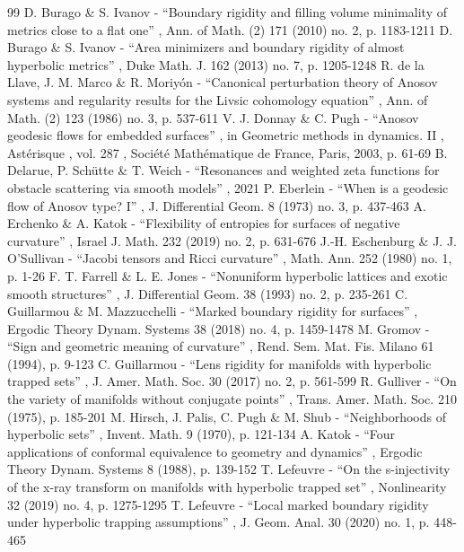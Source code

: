 \begin{thebibliography}{99}
 D. Burago \& S. Ivanov - “Boundary rigidity and filling volume minimality of metrics close to a flat one” , Ann. of Math. (2) 171 (2010) no. 2, p. 1183-1211
 D. Burago \& S. Ivanov - “Area minimizers and boundary rigidity of almost hyperbolic metrics” , Duke Math. J. 162 (2013) no. 7, p. 1205-1248
 R. de la Llave, J. M. Marco \& R. Moriyón - “Canonical perturbation theory of Anosov systems and regularity results for the Livsic cohomology equation” , Ann. of Math. (2) 123 (1986) no. 3, p. 537-611
 V. J. Donnay \& C. Pugh - “Anosov geodesic flows for embedded surfaces” , in Geometric methods in dynamics. II , Astérisque , vol. 287 , Société Mathématique de France, Paris, 2003, p. 61-69
 B. Delarue, P. Schütte \& T. Weich - “Resonances and weighted zeta functions for obstacle scattering via smooth models” , 2021
 P. Eberlein - “When is a geodesic flow of Anosov type? I” , J. Differential Geom. 8 (1973) no. 3, p. 437-463
 A. Erchenko \& A. Katok - “Flexibility of entropies for surfaces of negative curvature” , Israel J. Math. 232 (2019) no. 2, p. 631-676
 J.-H. Eschenburg \& J. J. O’Sullivan - “Jacobi tensors and Ricci curvature” , Math. Ann. 252 (1980) no. 1, p. 1-26
 F. T. Farrell \& L. E. Jones - “Nonuniform hyperbolic lattices and exotic smooth structures” , J. Differential Geom. 38 (1993) no. 2, p. 235-261
 C. Guillarmou \& M. Mazzucchelli - “Marked boundary rigidity for surfaces” , Ergodic Theory Dynam. Systems 38 (2018) no. 4, p. 1459-1478
 M. Gromov - “Sign and geometric meaning of curvature” , Rend. Sem. Mat. Fis. Milano 61 (1994), p. 9-123
 C. Guillarmou - “Lens rigidity for manifolds with hyperbolic trapped sets” , J. Amer. Math. Soc. 30 (2017) no. 2, p. 561-599
 R. Gulliver - “On the variety of manifolds without conjugate points” , Trans. Amer. Math. Soc. 210 (1975), p. 185-201
 M. Hirsch, J. Palis, C. Pugh \& M. Shub - “Neighborhoods of hyperbolic sets” , Invent. Math. 9 (1970), p. 121-134
 A. Katok - “Four applications of conformal equivalence to geometry and dynamics” , Ergodic Theory Dynam. Systems 8 (1988), p. 139-152
 T. Lefeuvre - “On the s-injectivity of the x-ray transform on manifolds with hyperbolic trapped set” , Nonlinearity 32 (2019) no. 4, p. 1275-1295
 T. Lefeuvre - “Local marked boundary rigidity under hyperbolic trapping assumptions” , J. Geom. Anal. 30 (2020) no. 1, p. 448-465

\end{thebibliography}
